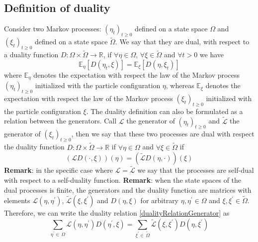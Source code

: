 \documentclass[11pt]{article}
\numberwithin{equation}{section}
\numberwithin{equation}{subsection}
\begin{document}
\subsection{Definition of duality}
Consider two Markov processes: $(\eta_{t})_{t\geq 0}$ defined on a state space $\Omega$ and $(\xi_{t})_{t\geq 0}$ defined on a state space $\widetilde{\Omega}$. We say that they are dual, with respect to a duality function $D:\Omega\times \widetilde{\Omega}\to \mathbb{R}$, if $\forall \eta\in\Omega$, $\forall \xi\in\widetilde{\Omega}$ and $\forall t> 0$ we have 
\begin{equation}
    \mathbb{E}_{\eta}\left[D(\eta_{t},\xi)\right]=\mathbb{E}_{\xi}\left[D(\eta,\xi_{t})\right]
\end{equation}
where $\mathbb{E}_{\eta}$ denotes the expectation with respect the law of the Markov process $(\eta_{t})_{t\geq 0}$ initialized with the particle configuration $\eta$, whereas $\mathbb{E}_{\xi}$ denotes the expectation with respect the law of the Markov process $(\xi_{t})_{t\geq 0}$ initialized with the particle configuration $\xi$.
The duality definition can also be formulated as a relation between the generators. Call $\mathcal{L}$ the generator of $(\eta_{t})_{t\geq0}$ and $\widetilde{\mathcal{L}}$ the generator of $(\xi_{t})_{t\geq 0}$, then we say that these two processes are dual with respect the duality function $D:\Omega\times \widetilde{\Omega}\to \mathbb{R}$ if $\forall \eta\in\Omega$ and $\forall \xi\in\widetilde{\Omega}$ if
\begin{equation}\label{dualityRelationGenerator}
    \left(\mathcal{L}D(\cdot,\xi)\right)(\eta)=\left(\widetilde{\mathcal{L}}D(\eta,\cdot)\right)(\xi)
\end{equation}
\textbf{Remark}:
in the specific case where $\mathcal{L}=\widetilde{\mathcal{L}}$ we say that the processes are self-dual with respect to a self-duality function.
\newline
\newline
\textbf{Remark}:
when the state spaces of the dual processes is finite, the generators and the duality function are matrices with elements $\mathcal{L}(\eta,\eta^{'})$, $\widetilde{\mathcal{L}}(\xi,\xi^{'})$ and $D(\eta,\xi)$ for arbitrary $\eta,\eta^{'}\in\Omega$ and $\xi,\xi^{'}\in \widetilde{\Omega}$. Therefore, we can write the duality relation \eqref{dualityRelationGenerator} as 
\begin{equation}
    \sum_{\eta^{'}\in\,\Omega}\mathcal{L}(\eta,\eta^{'})D(\eta^{'},\xi)=\sum_{\xi^{'}\in\, \widetilde{\Omega}}\widetilde{\mathcal{L}}(\xi,\xi^{'})D(\eta,\xi^{'})
\end{equation}
\end{document}
